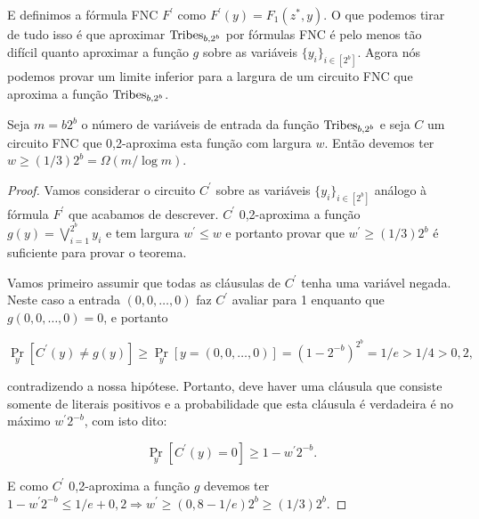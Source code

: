 E definimos a fórmula FNC $F^{\prime}$ como $F^{\prime}(y) = F_{1}(z^{*}, y)$. O que podemos tirar de tudo isso é que aproximar $\text{Tribes}_{b, 2^{b}}$ por fórmulas FNC é pelo menos tão difícil quanto aproximar a função $g$ sobre as variáveis $\{y_{i}\}_{i \in [2^{b}]}$. Agora nós podemos provar um limite inferior para a largura de um circuito FNC que aproxima a função $\text{Tribes}_{b, 2^{b}}$.

\begin{teo} \label{tribes_width_lb}

Seja $m = b2^{b}$ o número de variáveis de entrada da função $\text{Tribes}_{b, 2^{b}}$ e seja $C$ um circuito FNC que 0,2-aproxima esta função com largura $w$. Então devemos ter $w \geq (1/3)2^{b} = \Omega(m/\log m)$.

\end{teo}

\begin{proof}

Vamos considerar o circuito $C^{\prime}$ sobre as variáveis $\{y_{i}\}_{i \in [2^{b}]}$ análogo à fórmula $F^{\prime}$ que acabamos de descrever. $C^{\prime}$ 0,2-aproxima a função $g(y) = \bigvee_{i = 1}^{2^{b}} y_{i}$ e tem largura $w^{\prime} \leq w$ e portanto provar que $w^{\prime} \geq (1/3)2^{b}$ é suficiente para provar o teorema.

Vamos primeiro assumir que todas as cláusulas de $C^{\prime}$ tenha uma variável negada. Neste caso a entrada $(0, 0, \dots, 0)$ faz $C^{\prime}$ avaliar para 1 enquanto que $g(0, 0, \dots, 0) = 0$, e portanto

\begin{equation*}
	\Pr_{y}[C^{\prime}(y) \neq g(y)] \geq \Pr_{y}[y = (0, 0, \dots, 0)] = (1 - 2^{-b})^{2^{b}} = 1/e > 1/4 > 0,2,
\end{equation*}

contradizendo a nossa hipótese. Portanto, deve haver uma cláusula que consiste somente de literais positivos e a probabilidade que esta cláusula é verdadeira é no máximo $w^{\prime}2^{-b}$, com isto dito:

\begin{equation*}
	\Pr_{y}[C^{\prime}(y) = 0] \geq 1 - w^{\prime}2^{-b}.
\end{equation*}

E como $C^{\prime}$ 0,2-aproxima a função $g$ devemos ter $1 - w^{\prime}2^{-b} \leq 1/e + 0,2 \Rightarrow w^{\prime} \geq (0,8 - 1/e)2^{b} \geq (1/3)2^{b}$.

\end{proof}

